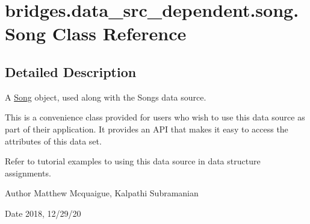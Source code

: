 \hypertarget{classbridges_1_1data__src__dependent_1_1song_1_1_song}{}\section{bridges.\+data\+\_\+src\+\_\+dependent.\+song.\+Song Class Reference}
\label{classbridges_1_1data__src__dependent_1_1song_1_1_song}


\subsection{Detailed Description}
A \hyperlink{classbridges_1_1data__src__dependent_1_1song_1_1_song}{Song} object, used along with the Songs data source. 

This is a convenience class provided for users who wish to use this data source as part of their application. It provides an A\+PI that makes it easy to access the attributes of this data set.

Refer to tutorial examples to using this data source in data structure assignments.

\begin{DoxyAuthor}{Author}
Matthew Mcquaigue, Kalpathi Subramanian 
\end{DoxyAuthor}
\begin{DoxyDate}{Date}
2018, 12/29/20 
\end{DoxyDate}
